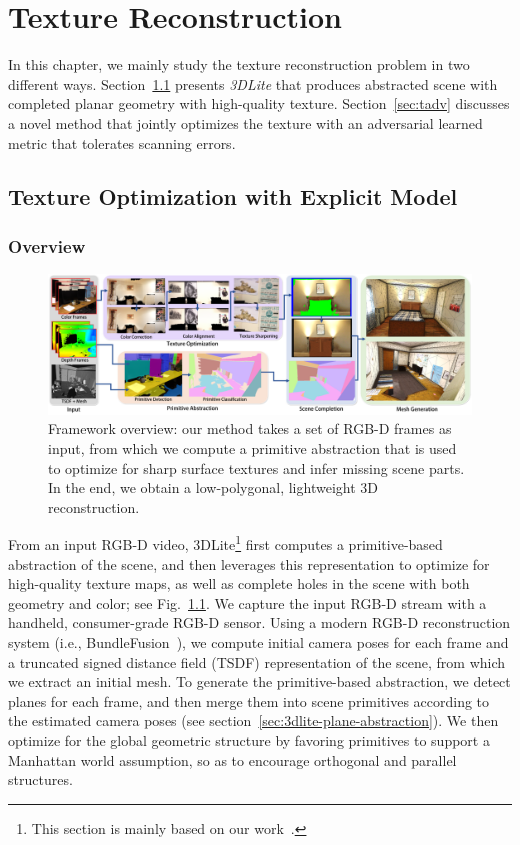 \chapter{Texture Reconstruction}
\label{chapter:texture-recon}
In this chapter, we mainly study the texture reconstruction problem in two different ways. Section~\ref{sec:toptim} presents \emph{3DLite} that produces abstracted scene with completed planar geometry with high-quality texture. Section~\ref{sec:tadv} discusses a novel method that jointly optimizes the texture with an adversarial learned metric that tolerates scanning errors.

\section{Texture Optimization with Explicit Model}
\label{sec:toptim}

\subsection{Overview}
\begin{figure}
    \centering
    \includegraphics[width=\textwidth]{3dlite/fig2.png}
    \caption{Framework overview: our method takes a set of RGB-D frames as input, from which we compute a primitive abstraction that is used to optimize for sharp surface textures and infer missing scene parts. In the end, we obtain a low-polygonal, lightweight 3D reconstruction.
    }
    \label{fig:3dlite-overview}
\end{figure}
From an input RGB-D video, 3DLite\footnote{This section is mainly based on our work~\cite{huang20173dlite}.} first computes a primitive-based abstraction of the scene, and then leverages this representation to optimize for high-quality texture maps, as well as complete holes in the scene with both geometry and color; see Fig.~\ref{fig:3dlite-overview}.
We capture the input RGB-D stream with a handheld, consumer-grade RGB-D sensor.
Using a modern RGB-D reconstruction system (i.e., BundleFusion~\cite{dai2016bundlefusion}), we compute initial camera poses for each frame and a truncated signed distance field (TSDF) representation of the scene, from which we extract an initial mesh.
To generate the primitive-based abstraction, we detect planes for each frame, and then merge them into scene primitives according to the estimated camera poses (see section~\ref{sec:3dlite-plane-abstraction}).
We then optimize for the global geometric structure by favoring primitives to support a Manhattan world assumption, so as to encourage orthogonal and parallel structures.

